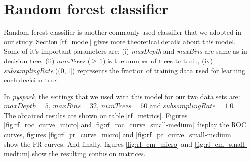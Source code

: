 \documentclass[LaM,binding=0.6cm, english]{sapthesis}
\begin{document}
\section{Random forest classifier}

Random forest classifier is another commonly used classifier that we adopted in our study. Section \ref{rf_model} gives more theoretical details about this model. Some of it's important parameters are: (i) \textit{maxDepth} and \textit{maxBins} are same as in decision tree; (ii) \textit{numTrees} ($\ge 1$) is the number of trees to train; (iv) \textit{subsamplingRate} ($(0, 1]$) represents the fraction of training data used for learning each decision tree.\cite{pysparkRF}

In \textit{pyspark}, the settings that we used with this model for our two data sets are: $maxDepth = 5$, $maxBins = 32$, $numTrees = 50$ and $subsamplingRate = 1.0$. The obtained results are shown on table \ref{rf_metrics}. Figures \ref{fig:rf_roc_curve_micro} and \ref{fig:rf_roc_curve_small-medium} display the ROC curves, figures \ref{fig:rf_pr_curve_micro} and \ref{fig:rf_pr_curve_small-medium} show the PR curves. And finally, figures \ref{fig:rf_cm_micro} and \ref{fig:rf_cm_small-medium} show the resulting confusion matrices.
 
\begin{table}[!ht]
\centering
{}
\vspace{2mm}
\caption{Random forest classifier metrics}
\label{rf_metrics}
\end{table}
\end{document}

